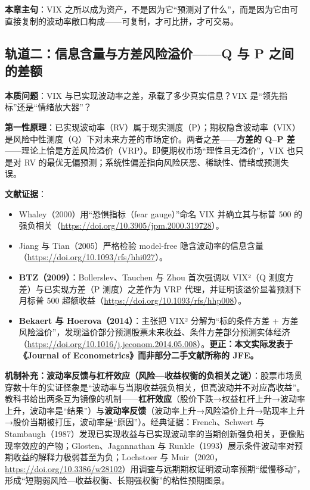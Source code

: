 \documentclass[11pt,a4paper]{article}
\begin{document}
\textbf{本章主句}：VIX 之所以成为资产，不是因为它“预测对了什么”，而是因为它由可直接复制的波动率敞口构成——可复制，才可比拼，才可交易。

\subsection{轨道二：信息含量与方差风险溢价——Q 与 P 之间的差额}

\textbf{本质问题}：VIX 与已实现波动率之差，承载了多少真实信息？VIX 是“领先指标”还是“情绪放大器”？

\textbf{第一性原理}：已实现波动率（RV）属于现实测度（P）；期权隐含波动率（VIX）是风险中性测度（Q）下对未来方差的市场定价。两者之差——\textbf{方差的 Q--P 差}——理论上恰是方差风险溢价（VRP）。即便期权市场“理性且无溢价”，VIX 也只是对 RV 的最优无偏预测；系统性偏差指向风险厌恶、稀缺性、情绪或预测失误。

\textbf{文献证据}：
\begin{itemize}[leftmargin=2.2em]
  \item Whaley（2000）用“恐惧指标（fear gauge）”命名 VIX 并确立其与标普 500 的强负相关（\url{https://doi.org/10.3905/jpm.2000.319728}）。
  \item Jiang 与 Tian（2005）严格检验 model-free 隐含波动率的信息含量（\url{https://doi.org/10.1093/rfs/hhi027}）。
  \item \textbf{BTZ（2009）}：Bollerslev、Tauchen 与 Zhou 首次强调以 VIX²（Q 测度方差）与已实现方差（P 测度）之差作为 VRP 代理，并证明该溢价显著预测下月标普 500 超额收益（\url{https://doi.org/10.1093/rfs/hhp008}）。
  \item \textbf{Bekaert 与 Hoerova（2014）}：主张把 VIX² 分解为“标的条件方差 + 方差风险溢价”，发现溢价部分预测股票未来收益、条件方差部分预测实体经济（\url{https://doi.org/10.1016/j.jeconom.2014.05.008}）。\textcolor{red!70!black}{\textbf{更正：本文实际发表于《Journal of Econometrics》而非部分二手文献所称的 JFE。}}
\end{itemize}

\textbf{机制补充：波动率反馈与杠杆效应（风险—收益权衡的负相关之谜）}：股票市场贯穿数十年的实证怪象是“波动率与当期收益强负相关，但高波动并不对应高收益”。教科书给出两条互为镜像的机制——\textbf{杠杆效应}（股价下跌→权益杠杆上升→波动率上升，波动率是“结果”）与\textbf{波动率反馈}（波动率上升→风险溢价上升→贴现率上升→股价当期被打压，波动率是“原因”）。经典证据：French、Schwert 与 Stambaugh（1987）发现已实现收益与已实现波动率的当期创新强负相关，更像贴现率效应的产物；Glosten、Jagannathan 与 Runkle（1993）展示条件波动率对预期收益的解释力极弱甚至为负；Lochstoer 与 Muir（2020，\url{https://doi.org/10.3386/w28102}）用调查与远期期权证明波动率预期“缓慢移动”，形成“短期弱风险—收益权衡、长期强权衡”的粘性预期图景。
\end{document}
